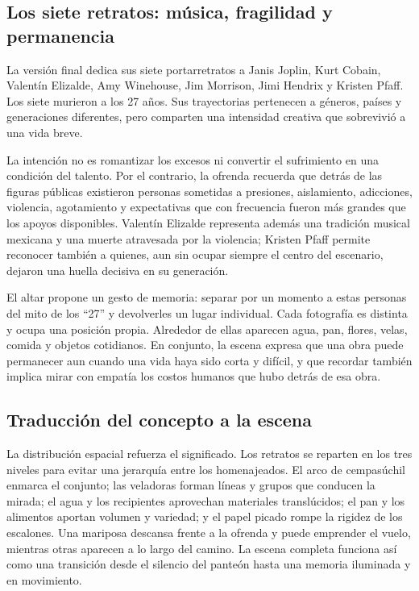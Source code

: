 \documentclass[letter,12pt]{article}
\begin{document}
	\subsection{Los siete retratos: música, fragilidad y permanencia}
	La versión final dedica sus siete portarretratos a Janis Joplin, Kurt Cobain, Valentín Elizalde, Amy Winehouse, Jim Morrison, Jimi Hendrix y Kristen Pfaff. Los siete murieron a los 27 años. Sus trayectorias pertenecen a géneros, países y generaciones diferentes, pero comparten una intensidad creativa que sobrevivió a una vida breve.

	La intención no es romantizar los excesos ni convertir el sufrimiento en una condición del talento. Por el contrario, la ofrenda recuerda que detrás de las figuras públicas existieron personas sometidas a presiones, aislamiento, adicciones, violencia, agotamiento y expectativas que con frecuencia fueron más grandes que los apoyos disponibles. Valentín Elizalde representa además una tradición musical mexicana y una muerte atravesada por la violencia; Kristen Pfaff permite reconocer también a quienes, aun sin ocupar siempre el centro del escenario, dejaron una huella decisiva en su generación.

	El altar propone un gesto de memoria: separar por un momento a estas personas del mito de los ``27'' y devolverles un lugar individual. Cada fotografía es distinta y ocupa una posición propia. Alrededor de ellas aparecen agua, pan, flores, velas, comida y objetos cotidianos. En conjunto, la escena expresa que una obra puede permanecer aun cuando una vida haya sido corta y difícil, y que recordar también implica mirar con empatía los costos humanos que hubo detrás de esa obra.

	\subsection{Traducción del concepto a la escena}
	La distribución espacial refuerza el significado. Los retratos se reparten en los tres niveles para evitar una jerarquía entre los homenajeados. El arco de cempasúchil enmarca el conjunto; las veladoras forman líneas y grupos que conducen la mirada; el agua y los recipientes aprovechan materiales translúcidos; el pan y los alimentos aportan volumen y variedad; y el papel picado rompe la rigidez de los escalones. Una mariposa descansa frente a la ofrenda y puede emprender el vuelo, mientras otras aparecen a lo largo del camino. La escena completa funciona así como una transición desde el silencio del panteón hasta una memoria iluminada y en movimiento.
\end{document}
